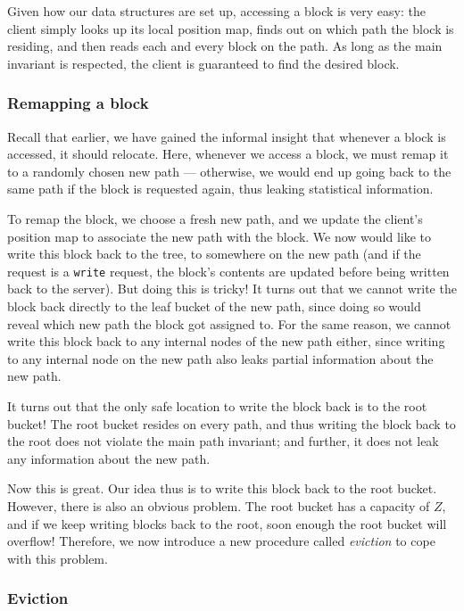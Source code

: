 Given how our data structures are set up, accessing a block is very
easy: the client simply looks up its local position map, finds out on
which path the block is residing, and then reads each and every block on
the path. As long as the main invariant is respected, the client is
guaranteed to find the desired block.

\subsubsection{Remapping a block}\label{remapping-a-block.}

Recall that earlier, we have gained the informal insight that whenever a
block is accessed, it should relocate. Here, whenever we access a block,
we must remap it to a randomly chosen new path --- otherwise, we would
end up going back to the same path if the block is requested again, thus
leaking statistical information.

To remap the block, we choose a fresh new path, and we update the
client's position map to associate the new path with the block. We now
would like to write this block back to the tree, to somewhere on the new
path (and if the request is a \texttt{write} request, the block's
contents are updated before being written back to the server). But doing
this is tricky! It turns out that we cannot write the block back
directly to the leaf bucket of the new path, since doing so would reveal
which new path the block got assigned to. For the same reason, we cannot
write this block back to any internal nodes of the new path either,
since writing to any internal node on the new path also leaks partial
information about the new path.

It turns out that the only safe location to write the block back is to
the root bucket! The root bucket resides on every path, and thus writing
the block back to the root does not violate the main path invariant; and
further, it does not leak any information about the new path.

Now this is great. Our idea thus is to write this block back to the root
bucket. However, there is also an obvious problem. The root bucket has a
capacity of \(Z\), and if we keep writing blocks back to the root, soon
enough the root bucket will overflow! Therefore, we now introduce a new
procedure called \emph{eviction} to cope with this problem.

\subsubsection{Eviction}\label{eviction.}

